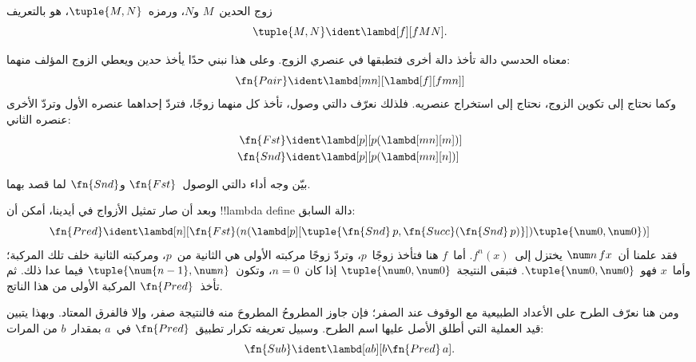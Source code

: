 \documentclass[../../../include/open-logic-section]{subfiles}
\begin{document}

\begin{defn}
زوج الحدين~$M$ و$N$، ورمزه~$\tuple{M,N}$، هو بالتعريف
\[
\tuple{M,N} \ident \lambd[f][fMN].
\]
\end{defn}
  
معناه الحدسي دالة تأخذ دالة أخرى فتطبقها في عنصري الزوج.
وعلى هذا نبني حدًا يأخذ حدين ويعطي الزوج المؤلف منهما:
\[
  \fn{Pair} \ident \lambd[mn][\lambd[f][fmn]]
\]
وكما نحتاج إلى تكوين الزوج، نحتاج إلى استخراج عنصريه.
فلذلك نعرّف دالتي وصول، تأخذ كل منهما زوجًا،
فتردّ إحداهما عنصره الأول وتردّ الأخرى عنصره الثاني:
\begin{align*}
  \fn{Fst} & \ident \lambd[p][p(\lambd[mn][m])]\\
  \fn{Snd} & \ident \lambd[p][p(\lambd[mn][n])]
\end{align*}

\begin{prob}
  بيّن وجه أداء دالتي الوصول~$\fn{Fst}$ و$\fn{Snd}$ لما قصد بهما.
\end{prob}

وبعد أن صار تمثيل الأزواج في أيدينا، أمكن أن !!{lambda define} دالة السابق:
\[
  \fn{Pred} \ident \lambd[n][\fn{Fst}(n (\lambd[p][\tuple{\fn{Snd}\, {p}, \fn{Succ}(\fn{Snd}\, {p})}]) \tuple{\num 0, \num 0})]
\]
فقد علمنا أن~$\num n\, f x$ يختزل إلى~$f^{n}(x)$.
أما~$f$ هنا فتأخذ زوجًا~$p$، وتردّ زوجًا مركبته الأولى هي الثانية من~$p$،
ومركبته الثانية خلف تلك المركبة؛ وأما~$x$ فهو~$\tuple{\num 0,\num 0}$.
فتبقى النتيجة~$\tuple{\num 0,\num 0}$ إذا كان~$n=0$،
وتكون~$\tuple{\num{n-1}, \num n}$ فيما عدا ذلك.
ثم تأخذ~$\fn{Pred}$ المركبة الأولى من هذا الناتج.

ومن هنا نعرّف الطرح على الأعداد الطبيعية مع الوقوف عند الصفر؛
فإن جاوز المطروحُ المطروحَ منه فالنتيجة صفر، وإلا فالفرق المعتاد.
وبهذا يتبين قيد العملية التي أطلق الأصل عليها اسم الطرح.
وسبيل تعريفه تكرار تطبيق~$\fn{Pred}$ في~$a$ بمقدار~$b$ من المرات:
\[
\fn{Sub} \ident \lambd[ab][b \fn{Pred}\, a].
\]
    
\end{document}
